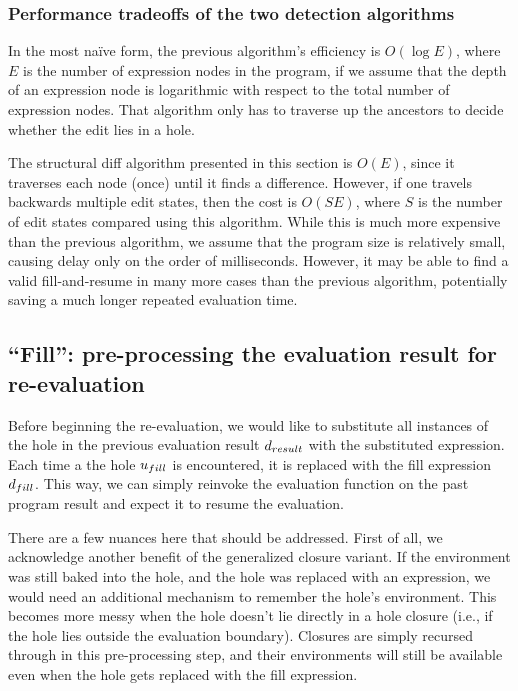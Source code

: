 \subsubsection{Performance tradeoffs of the two detection algorithms}
\label{sec:far-detect-compare}

In the most na\"ive form, the previous algorithm's efficiency is $O(\log E)$, where $E$ is the number of expression nodes in the program, if we assume that the depth of an expression node is logarithmic with respect to the total number of expression nodes. That algorithm only has to traverse up the ancestors to decide whether the edit lies in a hole.

The structural diff algorithm presented in this section is $O(E)$, since it traverses each node (once) until it finds a difference. However, if one travels backwards multiple edit states, then the cost is $O(SE)$, where $S$ is the number of edit states compared using this algorithm. While this is much more expensive than the previous algorithm, we assume that the program size is relatively small, causing delay only on the order of milliseconds. However, it may be able to find a valid fill-and-resume in many more cases than the previous algorithm, potentially saving a much longer repeated evaluation time.

\subsection{``Fill'': pre-processing the evaluation result for re-evaluation}
\label{sec:far-preprocessing}

Before beginning the re-evaluation, we would like to substitute all instances of the hole in the previous evaluation result $d_{result}$ with the substituted expression. Each time a the hole $u_{fill}$ is encountered, it is replaced with the fill expression $d_{fill}$. This way, we can simply reinvoke the evaluation function on the past program result and expect it to resume the evaluation.

There are a few nuances here that should be addressed. First of all, we acknowledge another benefit of the generalized closure variant. If the environment was still baked into the hole, and the hole was replaced with an expression, we would need an additional mechanism to remember the hole's environment. This becomes more messy when the hole doesn't lie directly in a hole closure (i.e., if the hole lies outside the evaluation boundary). Closures are simply recursed through in this pre-processing step, and their environments will still be available even when the hole gets replaced with the fill expression.

